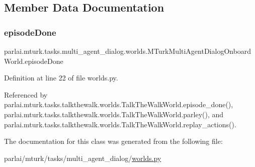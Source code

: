 \subsection{Member Data Documentation}
\mbox{\label{classparlai_1_1mturk_1_1tasks_1_1multi__agent__dialog_1_1worlds_1_1MTurkMultiAgentDialogOnboardWorld_ab64b208abf89723fe28967e054f4802e}} 
\subsubsection{\texorpdfstring{episode\+Done}{episodeDone}}
{\footnotesize\ttfamily parlai.\+mturk.\+tasks.\+multi\+\_\+agent\+\_\+dialog.\+worlds.\+M\+Turk\+Multi\+Agent\+Dialog\+Onboard\+World.\+episode\+Done}



Definition at line 22 of file worlds.\+py.



Referenced by parlai.\+mturk.\+tasks.\+talkthewalk.\+worlds.\+Talk\+The\+Walk\+World.\+episode\+\_\+done(), parlai.\+mturk.\+tasks.\+talkthewalk.\+worlds.\+Talk\+The\+Walk\+World.\+parley(), and parlai.\+mturk.\+tasks.\+talkthewalk.\+worlds.\+Talk\+The\+Walk\+World.\+replay\+\_\+actions().



The documentation for this class was generated from the following file\+:\begin{DoxyCompactItemize}
\item 
parlai/mturk/tasks/multi\+\_\+agent\+\_\+dialog/\hyperlink{parlai_2mturk_2tasks_2multi__agent__dialog_2worlds_8py}{worlds.\+py}\end{DoxyCompactItemize}
